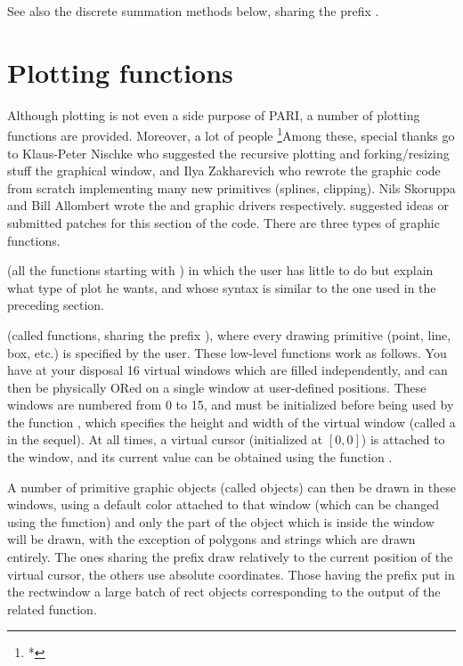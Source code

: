 See also the discrete summation methods below, sharing the prefix .


\section{Plotting functions}

  Although plotting is not even a side purpose of PARI, a number of plotting
functions are provided. Moreover, a lot of people
\footnote{*}{Among these, special thanks go to Klaus-Peter Nischke who
suggested the recursive plotting and forking/resizing stuff the graphical
window, and Ilya Zakharevich who rewrote the graphic code from scratch
implementing many new primitives (splines, clipping). Nils Skoruppa and Bill
Allombert wrote the  and  graphic drivers respectively.}
suggested ideas or submitted patches for this section of the code. There are
three types of graphic functions.

 (all the functions starting with
) in which the user has little to do but explain what type of plot
he wants, and whose syntax is similar to the one used in the preceding
section.

 (called  functions,
sharing the prefix ), where every drawing primitive (point, line,
box, etc.) is specified by the user. These low-level functions work as
follows. You have at your disposal 16 virtual windows which are filled
independently, and can then be physically ORed on a single window at
user-defined positions. These windows are numbered from 0 to 15, and must be
initialized before being used by the function , which specifies
the height and width of the virtual window (called a  in the
sequel). At all times, a virtual cursor (initialized at $[0,0]$) is attached
to the window, and its current value can be obtained using the function
.

A number of primitive graphic objects (called  objects) can then
be drawn in these windows, using a default color attached to that window
(which can be changed using the  function) and only the part
of the object which is inside the window will be drawn, with the exception of
polygons and strings which are drawn entirely. The ones sharing the prefix
 draw relatively to the current position of the virtual cursor,
the others use absolute coordinates. Those having the prefix 
put in the rectwindow a large batch of rect objects corresponding to the
output of the related  function.

